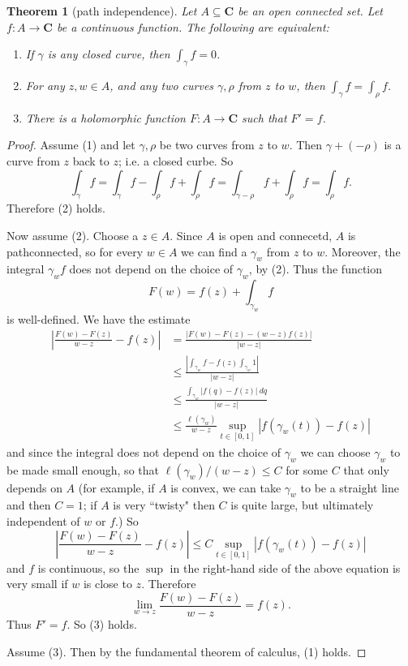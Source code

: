 \documentclass[12pt]{report}
\newcommand{\CC}{\mathbf{C}}
\newtheorem{theorem}{Theorem}[chapter]
\theoremstyle{definition}
\theoremstyle{remark}
\begin{document}
\begin{theorem}[path independence]
Let $A \subseteq \CC$ be an open connected set. Let $f: A \to \CC$ be a continuous function. The following are equivalent:
\begin{enumerate}
\item If $\gamma$ is any closed curve, then $\int_\gamma f = 0$.
\item For any $z, w \in A$, and any two curves $\gamma,\rho$ from $z$ to $w$, then $\int_\gamma f = \int_\rho f$.
\item There is a holomorphic function $F: A \to \CC$ such that $F' = f$.
\end{enumerate}
\end{theorem}
\begin{proof}
Assume (1) and let $\gamma, \rho$ be two curves from $z$ to $w$. Then $\gamma + (-\rho)$ is a curve from $z$ back to $z$; i.e. a closed curbe. So
$$\int_\gamma f = \int_\gamma f - \int_\rho f + \int_\rho f = \int_{\gamma-\rho} f + \int_\rho f = \int_\rho f.$$
Therefore (2) holds.

Now assume (2). Choose a $z \in A$. Since $A$ is open and connecetd, $A$ is pathconnected, so for every $w \in A$ we can find a $\gamma_w$ from $z$ to $w$. Moreover, the integral $\gamma_w f$ does not depend on the choice of $\gamma_w$, by (2). Thus the function
$$F(w) = f(z) + \int_{\gamma_w} f$$
is well-defined. We have the estimate
\begin{align*}
\left|\frac{F(w) - F(z)}{w - z} - f(z)\right| &= \frac{|F(w) - F(z) - (w-z)f(z)|}{|w - z|}\\
	&\leq \frac{|\int_{\gamma_w} f - f(z)\int_{\gamma_w}1|}{|w-z|}\\
	&\leq \frac{\int_{\gamma_w} |f(q)-f(z)| ~dq}{|w - z|}\\
	&\leq \frac{\ell(\gamma_w)}{w-z} \sup_{t \in [0, 1]} |f(\gamma_w(t)) - f(z)|
\end{align*}
and since the integral does not depend on the choice of $\gamma_w$ we can choose $\gamma_w$ to be made small enough, so that $\ell(\gamma_w)/(w-z) \leq C$ for some $C$ that only depends on $A$ (for example, if $A$ is convex, we can take $\gamma_w$ to be a straight line and then $C = 1$; if $A$ is very ``twisty" then $C$ is quite large, but ultimately independent of $w$ or $f$.) So
$$\left|\frac{F(w) - F(z)}{w - z} - f(z)\right| \leq C\sup_{t \in [0, 1]} |f(\gamma_w(t)) - f(z)|$$
and $f$ is continuous, so the $\sup$ in the right-hand side of the above equation is very small if $w$ is close to $z$. Therefore
$$\lim_{w \to z} \frac{F(w) - F(z)}{w - z} = f(z).$$
Thus $F' = f$. So (3) holds.

Assume (3). Then by the fundamental theorem of calculus, (1) holds.
\end{proof}
\end{document}
